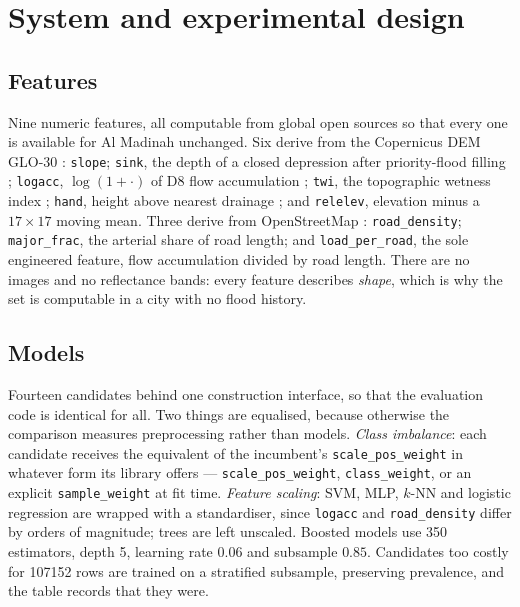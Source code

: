 \documentclass[11pt]{article}
\begin{document}
\section{System and experimental design}\label{sec:method}

\subsection{Features}
Nine numeric features, all computable from global open sources so that every one
is available for Al Madinah unchanged. Six derive from the Copernicus DEM
GLO-30 \citep{esa2022copdem}: \texttt{slope}; \texttt{sink}, the depth of a
closed depression after priority-flood filling \citep{barnes2014};
\texttt{logacc}, $\log(1+\cdot)$ of D8 flow accumulation
\citep{ocallaghan1984}; \texttt{twi}, the topographic wetness index
\citep{beven1979}; \texttt{hand}, height above nearest drainage
\citep{renno2008,nobre2011}; and \texttt{relelev}, elevation minus a
$17\times17$ moving mean. Three derive from OpenStreetMap \citep{osm}:
\texttt{road\_density}; \texttt{major\_frac}, the arterial share of road length;
and \texttt{load\_per\_road}, the sole engineered feature, flow accumulation
divided by road length. There are no images and no reflectance bands: every
feature describes \emph{shape}, which is why the set is computable in a city
with no flood history.

\subsection{Models}\label{sec:models}
Fourteen candidates behind one construction interface, so that the evaluation
code is identical for all. Two things are equalised, because otherwise the
comparison measures preprocessing rather than models. \emph{Class imbalance}:
each candidate receives the equivalent of the incumbent's
\texttt{scale\_pos\_weight} in whatever form its library offers ---
\texttt{scale\_pos\_weight}, \texttt{class\_weight}, or an explicit
\texttt{sample\_weight} at fit time. \emph{Feature scaling}: SVM, MLP,
$k$-NN and logistic regression are wrapped with a standardiser, since
\texttt{logacc} and \texttt{road\_density} differ by orders of magnitude; trees
are left unscaled. Boosted models use \num{350} estimators, depth \num{5},
learning rate $0.06$ and subsample $0.85$. Candidates too costly for
\num{107152} rows are trained on a stratified subsample, preserving prevalence,
and the table records that they were.
\end{document}
